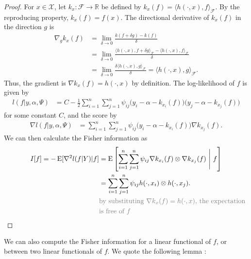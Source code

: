 \begin{proof}
	For $x \in \mathcal X$, let $k_x:\mathcal F \rightarrow \mathbb R$ be defined by $k_x(f) = \langle h(\cdot,x), f \rangle_{\mathcal F}$. By the reproducing property, $k_x(f) = f(x)$. The directional derivative of $k_x(f)$ in the direction $g$ is
	\begin{align*}
		\nabla_g k_x(f)	
		&= \lim_{\delta \rightarrow 0} \frac{k(f+\delta g) - k(f)}{\delta} \\
		&= \lim_{\delta \rightarrow 0} \frac{\langle h(\cdot,x), f+\delta g \rangle_{\mathcal F} - \langle h(\cdot,x), f \rangle_{\mathcal F}}{\delta} \\
		&= \lim_{\delta \rightarrow 0} \frac{\delta\langle h(\cdot,x), g \rangle_{\mathcal F}}{\delta} = \langle h(\cdot,x), g \rangle_{\mathcal F}.
	\end{align*}
	Thus, the gradient is $\nabla k_x(f) = h(\cdot,x)$ by definition. The log-likelihood of $f$ is given by
	\begin{align*}
		l(f|y,\alpha,\Psi) %
		&= C - \frac{1}{2} \sum_{i=1}^n\sum_{j=1}^n \psi_{ij}\big(y_i - \alpha - k_{x_i}(f)\big)\big(y_j - \alpha - k_{x_j}(f)\big)
	\end{align*}
	for some constant $C$, and the score by
	\begin{align*}
		\nabla l(f|y,\alpha,\Psi) 
		&= \sum_{i=1}^n\sum_{j=1}^n \psi_{ij}\big(y_i - \alpha - k_{x_i}(f)\big)\nabla k_{x_j}(f).
	\end{align*}
	We can then calculate the Fisher information as
	\begin{align*}
		I[f] = -\E[\nabla^2 l(f|Y) | f] 
		&=\E \left[ \sum_{i=1}^n\sum_{j=1}^n \psi_{ij} \nabla k_{x_i}(f) \otimes \nabla k_{x_j}(f) \ \Bigg | \ f \right] \\
		&=\sum_{i=1}^n\sum_{j=1}^n \psi_{ij} h(\cdot,x_i) \otimes h(\cdot,x_j). \\
		&\rlap {\color{gray}\text{by substituting $\nabla k_x(f) = h(\cdot,x)$, the expectation}} \\
		&\rlap {\color{gray}\text{is free of $f$}} 
	\end{align*}	 	
\end{proof}

\vspace{-3mm} 
We can also compute the Fisher information for a linear functional of $f$, or between two linear functionals of $f$. We quote the following lemma \citep{Bergsma2014}:

